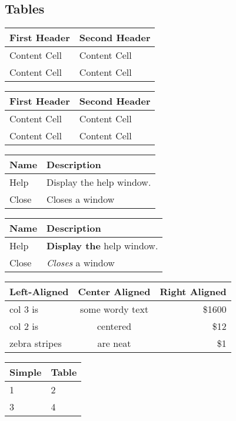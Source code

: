 \subsection{Tables}

\noindent\begin{tabularx}{\textwidth}{|X|X|}\hline
First Header  & Second Header\\ \hline
Content Cell  & Content Cell\\ \hline
Content Cell  & Content Cell\\ \hline
\end{tabularx}


\noindent\begin{tabularx}{\textwidth}{|X|X|}\hline
First Header  & Second Header\\ \hline
Content Cell  & Content Cell\\ \hline
Content Cell  & Content Cell\\ \hline
\end{tabularx}


\noindent\begin{tabularx}{\textwidth}{|X|X|}\hline
Name & Description\\ \hline
Help      & Display the help window.\\ \hline
Close     & Closes a window\\ \hline
\end{tabularx}


\noindent\begin{tabularx}{\textwidth}{|X|X|}\hline
Name & Description\\ \hline
Help      & \textbf{Display the} help window.\\ \hline
Close     & \textit{Closes} a window\\ \hline
\end{tabularx}


\noindent\begin{tabularx}{\textwidth}{|l|c|r|}\hline
Left-Aligned  & Center Aligned  & Right Aligned\\ \hline
col 3 is      & some wordy text & \$1600\\ \hline
col 2 is      & centered        &   \$12\\ \hline
zebra stripes & are neat        &    \$1\\ \hline
\end{tabularx}


\noindent\begin{tabularx}{\textwidth}{|X|X|}\hline
Simple & Table\\ \hline
1      & 2\\ \hline
3      & 4\\ \hline
\end{tabularx}


